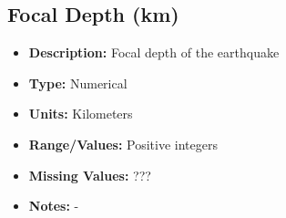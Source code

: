 \documentclass{article}
\begin{document}
\begin{comment}

\subsection{Latitude}
\begin{itemize}
    \item \textbf{Description:} Latitude of the location where the earthquake happened
    \item \textbf{Type:} Numerical
    \item \textbf{Units:} Degrees
    \item \textbf{Range/Values:} -90 - 90, rounded to the nearest thousandths
    \item \textbf{Missing Values:} ???
    \item \textbf{Notes:} -
\end{itemize}

\subsection{Longitude}
\begin{itemize}
    \item \textbf{Description:} Longitude of the location where the earthquake happened
    \item \textbf{Type:} Numerical
    \item \textbf{Units:} Degrees
    \item \textbf{Range/Values:} -180 - 180, rounded to the nearest thousandths
    \item \textbf{Missing Values:} ???
    \item \textbf{Notes:} -
\end{itemize}
    
\end{comment}

\subsection{Focal Depth (km)}
\begin{itemize}
    \item \textbf{Description:} Focal depth of the earthquake
    \item \textbf{Type:} Numerical
    \item \textbf{Units:} Kilometers
    \item \textbf{Range/Values:} Positive integers
    \item \textbf{Missing Values:} ???
    \item \textbf{Notes:} -
\end{itemize}
\end{document}
